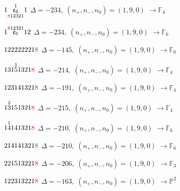 \documentclass[10pt]{article}
\begin{document}
\smallskip

$1\overset{1}{\underset{\textcolor{red}{8}12321}{\mathfrak{e}_6}}1$ \quad $\Delta=-234,\; (n_+,n_-,n_0)=(1,9,0)$ \quad $\to \mathbb{F}_{4}$

\smallskip

$1\overset{\textcolor{red}{8}12321}{\mathfrak{e}_6}12$ \quad $\Delta=-234,\; (n_+,n_-,n_0)=(1,9,0)$ \quad $\to \mathbb{F}_{6}$

\smallskip

$122222221\textcolor{red}{8}$ \quad $\Delta=-145,\; (n_+,n_-,n_0)=(1,9,0)$ \quad $\to \mathbb{F}_{0}$

\smallskip

$131\overset{1}{5}1321\textcolor{red}{8}$ \quad $\Delta=-214,\; (n_+,n_-,n_0)=(1,9,0)$ \quad $\to \mathbb{F}_{4}$

\smallskip

$123141321\textcolor{red}{8}$ \quad $\Delta=-191,\; (n_+,n_-,n_0)=(1,9,0)$ \quad $\to \mathbb{F}_{4}$

\smallskip

$1\overset{2}{3}151321\textcolor{red}{8}$ \quad $\Delta=-215,\; (n_+,n_-,n_0)=(1,9,0)$ \quad $\to \mathbb{F}_{4}$

\smallskip

$1\overset{1}{4}141321\textcolor{red}{8}$ \quad $\Delta=-210,\; (n_+,n_-,n_0)=(1,9,0)$ \quad $\to \mathbb{F}_{6}$

\smallskip

$214141321\textcolor{red}{8}$ \quad $\Delta=-210,\; (n_+,n_-,n_0)=(1,9,0)$ \quad $\to \mathbb{F}_{6}$

\smallskip

$221513221\textcolor{red}{8}$ \quad $\Delta=-206,\; (n_+,n_-,n_0)=(1,9,0)$ \quad $\to \mathbb{F}_{3}$

\smallskip

$122313221\textcolor{red}{8}$ \quad $\Delta=-163,\; (n_+,n_-,n_0)=(1,9,0)$ \quad $\to \mathbb{P}^2$

\smallskip
\end{document}
